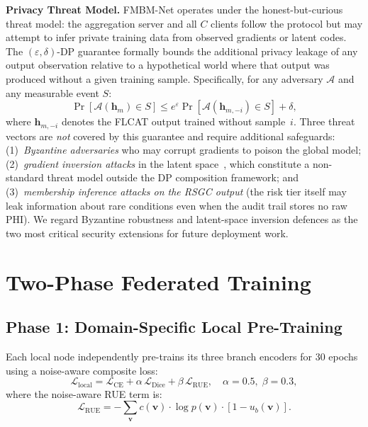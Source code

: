 \documentclass{ieeeaccess}
\begin{document}
\textbf{Privacy Threat Model.}
FMBM-Net operates under the honest-but-curious threat model: the aggregation
server and all $C$ clients follow the protocol but may attempt to infer
private training data from observed gradients or latent codes.
The $(\varepsilon,\delta)$-DP guarantee formally bounds the additional
privacy leakage of any output observation relative to a hypothetical world
where that output was produced without a given training sample.
Specifically, for any adversary $\mathcal{A}$ and any measurable event $S$:
\begin{equation}
\Pr[\mathcal{A}(\mathbf{h}_m) \in S] \leq
e^\varepsilon \Pr[\mathcal{A}(\mathbf{h}_{m,-i}) \in S] + \delta,
\label{eq:dp_guarantee}
\end{equation}
where $\mathbf{h}_{m,-i}$ denotes the FLCAT output trained without sample~$i$.
Three threat vectors are \emph{not} covered by this guarantee and require
additional safeguards: (1)~\emph{Byzantine adversaries} who may corrupt
gradients to poison the global model; (2)~\emph{gradient inversion attacks}
in the latent space~\cite{geiping2020invertinggradients}, which constitute
a non-standard threat model outside the DP composition framework;
and (3)~\emph{membership inference attacks on the RSGC output}
(the risk tier itself may leak information about rare conditions
even when the audit trail stores no raw PHI). We regard Byzantine
robustness and latent-space inversion defences as the two most critical
security extensions for future deployment work.

\section{Two-Phase Federated Training}
\label{sec:training}

\subsection{Phase 1: Domain-Specific Local Pre-Training}

Each local node independently pre-trains its three branch encoders for 30
epochs using a noise-aware composite loss:
\begin{equation}
\mathcal{L}_{\mathrm{local}} =
\mathcal{L}_{\mathrm{CE}} + \alpha\,\mathcal{L}_{\mathrm{Dice}} +
\beta\,\mathcal{L}_{\mathrm{RUE}},\quad \alpha\!=\!0.5,\;\beta\!=\!0.3,
\label{eq:local_loss}
\end{equation}
where the noise-aware RUE term is:
\begin{equation}
\mathcal{L}_{\mathrm{RUE}} =
-\sum_{\mathbf{v}} c(\mathbf{v})\cdot\log p(\mathbf{v})\cdot
[1 - u_b(\mathbf{v})].
\label{eq:rue_loss}
\end{equation}
\end{document}
